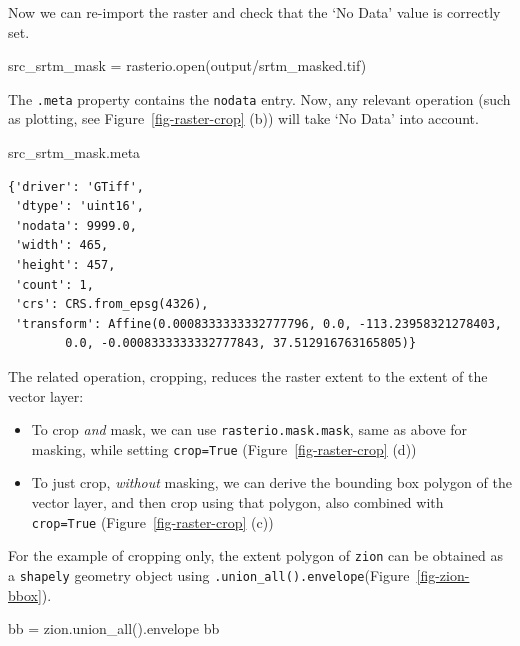 \documentclass[
  letterpaper,
]{krantz}
\newenvironment{Shaded}{\begin{snugshade}}{\end{snugshade}}
\newcommand{\BuiltInTok}[1]{\textcolor[rgb]{0.00,0.23,0.31}{#1}}
\newcommand{\NormalTok}[1]{\textcolor[rgb]{0.00,0.23,0.31}{#1}}
\newcommand{\OperatorTok}[1]{\textcolor[rgb]{0.37,0.37,0.37}{#1}}
\newcommand{\StringTok}[1]{\textcolor[rgb]{0.13,0.47,0.30}{#1}}
\providecommand{\tightlist}{%
  \setlength{\itemsep}{0pt}\setlength{\parskip}{0pt}}\usepackage{longtable,booktabs,array}
\begin{document}
Now we can re-import the raster and check that the `No Data' value is
correctly set.

\begin{Shaded}
\begin{Highlighting}[]
\NormalTok{src\_srtm\_mask }\OperatorTok{=}\NormalTok{ rasterio.}\BuiltInTok{open}\NormalTok{(}\StringTok{\textquotesingle{}output/srtm\_masked.tif\textquotesingle{}}\NormalTok{)}
\end{Highlighting}
\end{Shaded}

The \texttt{.meta} property contains the \texttt{nodata} entry. Now, any
relevant operation (such as plotting, see Figure~\ref{fig-raster-crop}
(b)) will take `No Data' into account.

\begin{Shaded}
\begin{Highlighting}[]
\NormalTok{src\_srtm\_mask.meta}
\end{Highlighting}
\end{Shaded}

\begin{verbatim}
{'driver': 'GTiff',
 'dtype': 'uint16',
 'nodata': 9999.0,
 'width': 465,
 'height': 457,
 'count': 1,
 'crs': CRS.from_epsg(4326),
 'transform': Affine(0.0008333333332777796, 0.0, -113.23958321278403,
        0.0, -0.0008333333332777843, 37.512916763165805)}
\end{verbatim}

The related operation, cropping, reduces the raster extent to the extent
of the vector layer:

\begin{itemize}
\tightlist
\item
  To crop \emph{and} mask, we can use \texttt{rasterio.mask.mask}, same
  as above for masking, while setting \texttt{crop=True}
  (Figure~\ref{fig-raster-crop} (d))
\item
  To just crop, \emph{without} masking, we can derive the bounding box
  polygon of the vector layer, and then crop using that polygon, also
  combined with \texttt{crop=True} (Figure~\ref{fig-raster-crop} (c))
\end{itemize}

For the example of cropping only, the extent polygon of \texttt{zion}
can be obtained as a \texttt{shapely} geometry object using
\texttt{.union\_all().envelope}(Figure~\ref{fig-zion-bbox}).

\begin{Shaded}
\begin{Highlighting}[]
\NormalTok{bb }\OperatorTok{=}\NormalTok{ zion.union\_all().envelope}
\NormalTok{bb}
\end{Highlighting}
\end{Shaded}
\end{document}
